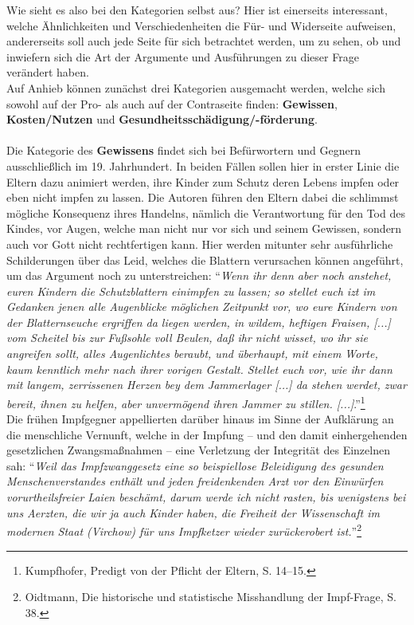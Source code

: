 \documentclass[
    a4paper,
    12pt,
    hyphens,
    chapterprefix=true,
    headheight=33pt,
    footheight=29pt,
    headings=optiontohead, %
]{scrartcl}
\begin{document}
{\newpage
Wie sieht es also bei den Kategorien selbst aus? Hier ist einerseits interessant, welche Ähnlichkeiten und Verschiedenheiten die Für- und Widerseite aufweisen, andererseits soll auch jede Seite für sich betrachtet werden, um zu sehen, ob und inwiefern sich die Art der Argumente und Ausführungen zu dieser Frage verändert haben.\\
Auf Anhieb können zunächst drei Kategorien ausgemacht werden, welche sich sowohl auf der Pro- als auch auf der Contraseite finden: \textbf{Gewissen}, \textbf{Kosten/Nutzen} und \textbf{Gesundheitsschädigung/-förderung}.\\
\\
Die Kategorie des \textbf{Gewissens} findet sich bei Befürwortern und Gegnern ausschließlich im 19. Jahrhundert. In beiden Fällen sollen hier in erster Linie die Eltern dazu animiert werden, ihre Kinder zum Schutz deren Lebens impfen oder eben nicht impfen zu lassen. Die Autoren führen den Eltern dabei die schlimmst mögliche Konsequenz ihres Handelns, nämlich die Verantwortung für den Tod des Kindes, vor Augen, welche man nicht nur vor sich und seinem Gewissen, sondern auch vor Gott nicht rechtfertigen kann. Hier werden mitunter sehr ausführliche Schilderungen über das Leid, welches die Blattern verursachen können angeführt, um das Argument noch zu unterstreichen: "`\textit{Wenn ihr denn aber noch anstehet, euren Kindern die Schutzblattern einimpfen zu lassen; so stellet euch izt im Gedanken jenen alle Augenblicke möglichen Zeitpunkt vor, wo eure Kindern von der Blatternseuche ergriffen da liegen werden, in wildem, heftigen Fraisen, [...] vom Scheitel bis zur Fußsohle voll Beulen, daß ihr nicht wisset, wo ihr sie angreifen sollt,  alles Augenlichtes beraubt, und überhaupt, mit einem Worte, kaum kenntlich mehr nach ihrer vorigen Gestalt. Stellet euch vor, wie ihr dann mit langem, zerrissenen Herzen bey dem Jammerlager [...] da stehen werdet, zwar bereit, ihnen zu helfen, aber unvermögend ihren Jammer zu stillen. [...]}."'\footnote{Kumpfhofer, Predigt von der Pflicht der Eltern, S. 14--15.}\\
Die frühen Impfgegner appellierten darüber hinaus im Sinne der Aufklärung an die menschliche Vernunft, welche in der Impfung -- und den damit einhergehenden gesetzlichen Zwangsmaßnahmen -- eine Verletzung der Integrität des Einzelnen sah: "`\textit{Weil das Impfzwanggesetz eine so beispiellose Beleidigung des gesunden Menschenverstandes enthält und jeden freidenkenden Arzt vor den Einwürfen vorurtheilsfreier Laien beschämt, darum werde ich nicht rasten, bis wenigstens bei uns Aerzten, die wir ja auch Kinder haben, die Freiheit der Wissenschaft im modernen Staat (Virchow) für uns Impfketzer wieder zurückerobert ist.}"'\footnote{Oidtmann, Die historische und statistische Misshandlung der Impf-Frage, S. 38.}\\
}
\end{document}
